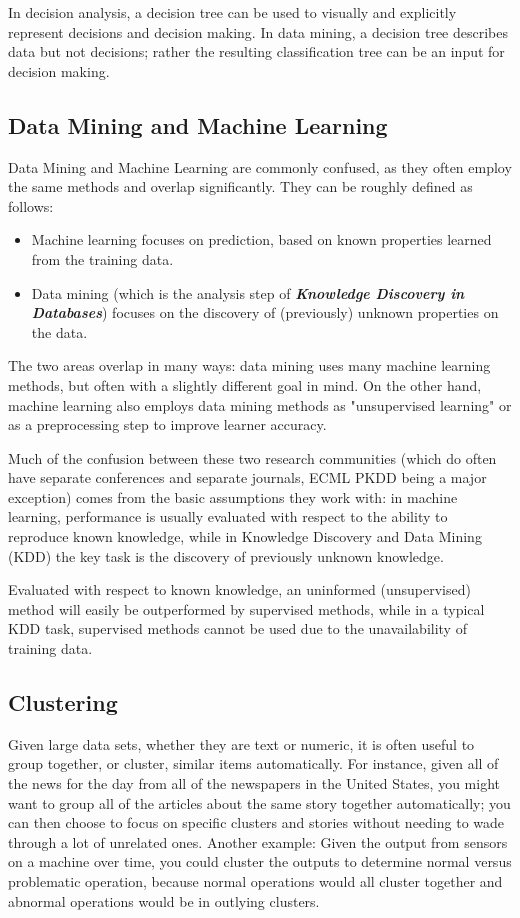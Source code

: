 \documentclass[11pt]{article} %
\begin{document}
In decision analysis, a decision tree can be used to visually and explicitly represent decisions and decision making. In data mining, a decision tree describes data but not decisions; rather the resulting classification tree can be an input for decision making.

\subsection{Data Mining and Machine Learning}
Data Mining and Machine Learning are commonly confused, as they often employ the same methods and overlap significantly. They can be roughly defined as follows:
\begin{itemize}
\item Machine learning focuses on prediction, based on known properties learned from the training data.
\item Data mining (which is the analysis step of \emph{\textbf{Knowledge Discovery in Databases}}) focuses on the discovery of (previously) unknown properties on the data.
\end{itemize}
The two areas overlap in many ways: data mining uses many machine learning methods, but often with a slightly different goal in mind. On the other hand, machine learning also employs data mining methods as "unsupervised learning" or as a preprocessing step to improve learner accuracy.

Much of the confusion between these two research communities (which do often have separate conferences and separate journals, ECML PKDD being a major exception) comes from the basic assumptions they work with: in machine learning, performance is usually evaluated with respect to the ability to reproduce known knowledge, while in Knowledge Discovery and Data Mining (KDD) the key task is the discovery of previously unknown knowledge.

Evaluated with respect to known knowledge, an uninformed (unsupervised) method will easily be outperformed by supervised methods, while in a typical KDD task, supervised methods cannot be used due to the unavailability of training data.
\subsection{Clustering}
Given large data sets, whether they are text or numeric, it is often useful to group together, or cluster, similar items automatically. For instance, given all of the news for the day from all of the newspapers in the United States, you might want to group all of the articles about the same story together automatically; you can then choose to focus on specific clusters and stories without needing to wade through a lot of unrelated ones. Another example: Given the output from sensors on a machine over time, you could cluster the outputs to determine normal versus problematic operation, because normal operations would all cluster together and abnormal operations would be in outlying clusters.
\end{document}
